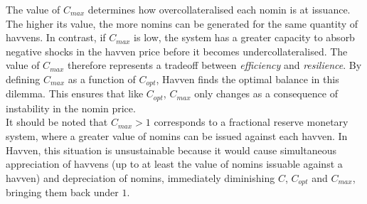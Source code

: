 \noindent The value of $C_{max}$ determines how overcollateralised each nomin
is at issuance. The higher its value, the more nomins can be generated for
the same quantity of havvens. In contrast, if $C_{max}$ is low, the system
has a greater capacity to absorb negative shocks in the havven price before
it becomes undercollateralised. The value of $C_{max}$ therefore represents a
tradeoff between \textit{efficiency} and \textit{resilience}. By defining
$C_{max}$ as a function of $C_{opt}$, Havven finds the optimal balance in
this dilemma. This ensures that like $C_{opt}$, $C_{max}$ only changes as a
consequence of instability in the nomin price. \\

\noindent It should be noted that $C_{max} > 1$ corresponds to a fractional
reserve monetary system, where a greater value of nomins can be issued
against each havven. In Havven, this situation is unsustainable because it
would cause simultaneous appreciation of havvens (up to at least the value of
nomins issuable against a havven) and depreciation of nomins, immediately
diminishing $C$, $C_{opt}$ and $C_{max}$, bringing them back under $1$.
